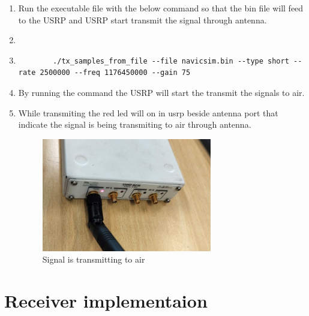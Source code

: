 \begin{enumerate}
\begin{lstlisting}
    \end{lstlisting}
    \item Run the executable file with the below command so that the bin file will feed to the USRP and USRP start transmit the signal through antenna.
    \item[]
    \item[]
    \begin{lstlisting}
        ./tx_samples_from_file --file navicsim.bin --type short --rate 2500000 --freq 1176450000 --gain 75
    \end{lstlisting}
    \item By running the command the USRP will start the transmit the signals to air.
    \item While transmiting the red led will on in usrp beside antenna port that indicate the signal is being transmiting to air through antenna.
    \begin{normalsize}
        \begin{figure}[!ht]
            \centering
            \includegraphics[width=0.7\textwidth]{figs/usrp_transmit.png}
            \centering
            \captionsetup{justification=centering}
            \caption{Signal is transmitting to air}
            \end{figure}
        \end{normalsize}
    
\end{enumerate}


\section{Receiver implementaion}


